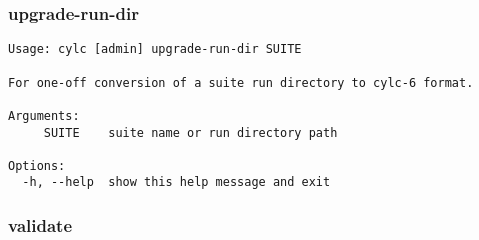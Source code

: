 \subsubsection{upgrade-run-dir}
\label{upgrade-run-dir}
\begin{lstlisting}
Usage: cylc [admin] upgrade-run-dir SUITE

For one-off conversion of a suite run directory to cylc-6 format.

Arguments:
     SUITE    suite name or run directory path

Options:
  -h, --help  show this help message and exit
\end{lstlisting}
\subsubsection{validate}
\label{validate}
